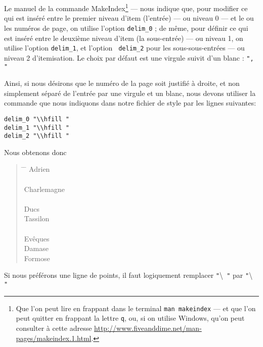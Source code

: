 Le manuel de la commande MakeIndex\footnote{Que l'on peut lire en frappant dans le terminal \verb+man makeindex+ --- et que l'on peut quitter en frappant la lettre  \verb|q|, ou, si on utilise Windows, qu'on peut consulter à cette adresse \url{http://www.fiveanddime.net/man-pages/makeindex.1.html}.} --- nous indique que, pour modifier ce qui est inséré entre le premier niveau d'item (l'entrée) --- ou niveau 0 --- et le ou les numéros de page, on utilise l'option \verb|delim_0| ; de même, pour définir ce qui est inséré entre le deuxième niveau d'item (la sous-entrée) --- ou niveau 1, on utilise l'option \verb+delim_1+, et l'option \verb| delim_2| pour les sous-sous-entrées --- ou niveau 2 d'itemisation. Le choix par défaut est une virgule suivit d'un blanc : \verb|", "|

Ainsi, si nous désirons que le numéro de la page soit justifié à droite, et non simplement séparé de l'entrée par une virgule et un blanc, nous devons utiliser la commande  que nous indiquons dans notre fichier de style par les lignes suivantes:

\begin{verbatim}
delim_0 "\\hfill "
delim_1 "\\hfill "
delim_2 "\\hfill "
\end{verbatim}

Nous obtenons donc 

\begin{quotation}
\begin{tabbing}
\hspace{0,5cm}  \=  \hspace{3cm} \= \kill
Adrien\> \\
\\
Charlemagne \> \\
\\
Ducs \\
\> Tassilon\\
\\
Evêques \\
\> Damase \\
\> Formose\\
\end{tabbing}
\end{quotation}

Si nous préférons une ligne de points, il faut logiquement remplacer \verb|"|\textbackslash{}\verb| "| par \verb|"|\textbackslash{}\verb| "|

